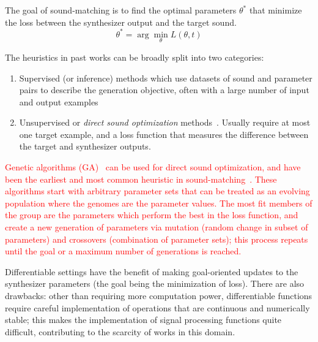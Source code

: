\documentclass[lettersize,journal]{IEEEtran}
\newcommand{\todo}[1]{\textcolor{red}{#1}}
\providecommand{\gls}[1]{#1}
\begin{document}
The goal of sound-matching is to find the optimal parameters $\theta^*$ that minimize the loss between the synthesizer output and the target sound. 
\[
\theta^* = \arg\min_{\theta} L(\theta,t)
\]


The heuristics in past works can be broadly split into two categories:
\begin{enumerate}
    \item Supervised (or inference) methods which use datasets of sound and parameter pairs to describe the generation objective, often with a large number of input and output examples~\cite{engel2020ddsp,salimi2020make,yee2018automatic,esling2019flow}
    \item Unsupervised or \textit{direct sound optimization} methods~\cite{horner1993machine,mitchell2007evolutionary,yee2018automatic,vahidi2023mesostructures}. Usually require at most one target example, and a loss function that measures the difference between the target and synthesizer outputs. 
\end{enumerate}

\todo{
Genetic algorithms (\gls{GA})~\cite{holland1992genetic} can be used for direct sound optimization, and have been the earliest and most common heuristic in sound-matching~\cite{horner1993machine,mitchell2007evolutionary,yee2018automatic}. These algorithms start with arbitrary parameter sets that can be treated as an evolving population where the genomes are the parameter values. The most fit members of the group are the parameters which perform the best in the loss function, and create a new generation of parameters via mutation (random change in subset of parameters) and crossovers (combination of parameter sets); this process repeats until the goal or a maximum number of generations is reached.}

 Differentiable settings have the benefit of making goal-oriented updates to the synthesizer parameters (the goal being the minimization of loss). There are also drawbacks: other than requiring more computation power, differentiable functions require careful implementation of operations that are continuous and numerically stable; this makes the implementation of signal processing functions quite difficult, contributing to the scarcity of works in this domain.

\end{document}

